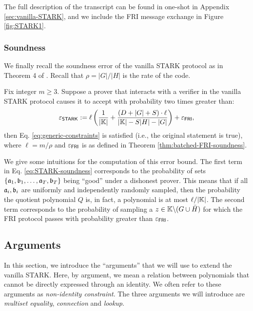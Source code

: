The full description of the transcript can be found in one-shot in Appendix \ref{sec:vanilla-STARK}, and we include the FRI message exchange in Figure \ref{fig:STARK1}.

\subsubsection*{Soundness}

We finally recall the soundness error of the vanilla STARK protocol as in Theorem 4 of \cite{EPRINT:StarkWare21}. Recall that $\rho = |G|/|H|$ is the rate of the code. 
\begin{theorem}[Soundness]\label{thm:STARK-soundness}
  Fix integer $m \geq 3$. Suppose a prover that interacts with a verifier in the vanilla STARK protocol causes it to accept with probability two times greater than:
  \begin{equation}\label{eq:STARK-soundness}
    \varepsilon_{\textsf{STARK}} := \ell \left(\frac{1}{|\mathbb{K}|} + \frac{(D + |G| + S)\cdot \ell}{|\mathbb{K}|-S|H|-|G|} \right) + \varepsilon_{\textsf{FRI}},
  \end{equation}
  then Eq. \eqref{eq:generic-constraints} is satisfied (i.e., the original statement is true), where $\ell = m/\rho$ and $\varepsilon_{\textsf{FRI}}$ is as defined in Theorem \ref{thm:batched-FRI-soundness}.
\end{theorem}
We give some intuitions for the computation of this error bound. The first term in Eq. \eqref{eq:STARK-soundness} corresponds to the probability of sets $\{\mathfrak{a}_1,\mathfrak{b}_1,\dots,\mathfrak{a}_T,\mathfrak{b}_T\}$ being ``good'' under a dishonest prover. This means that if all $\mathfrak{a}_i,\mathfrak{b}_i$ are uniformly and independently randomly sampled, then the probability the quotient polynomial $Q$ is, in fact, a polynomial is at most $\ell/|\mathbb{K}|$. The second term corresponds to the probability of sampling a $z \in \mathbb{K} \backslash (G \cup \bar{H})$ for which the FRI protocol passes with probability greater than $\varepsilon_{\textsf{FRI}}$.


\subsection{Arguments}\label{sec:preliminaries:arguments}

In this section, we introduce the ``arguments'' that we will use to extend the vanilla STARK. Here, by argument, we mean a relation between polynomials that cannot be directly expressed through an identity. We often refer to these arguments as \textit{non-identity constraint}. The three arguments we will introduce are \textit{multiset equality}, \textit{connection} and \textit{lookup}.

